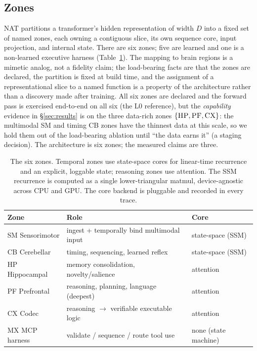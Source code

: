\documentclass[11pt]{article}
\newcommand{\zone}[1]{\textsc{#1}}
\begin{document}
\subsection{Zones}
NAT partitions a transformer's hidden representation of width $D$ into a fixed set of named zones,
each owning a contiguous slice, its own sequence core, input projection, and internal state. There
are six zones; five are learned and one is a non-learned executive harness (Table~\ref{tab:zones}).
The mapping to brain regions is a mimetic analog, not a fidelity claim; the load-bearing facts are
that the zones are declared, the partition is fixed at build time, and the assignment of a
representational slice to a named function is a property of the architecture rather than a discovery
made after training. All six zones are declared and the forward pass is exercised end-to-end on all
six (the L0 reference), but the \emph{capability} evidence in \S\ref{sec:results} is on the three
data-rich zones $\{\zone{HP},\zone{PF},\zone{CX}\}$: the multimodal \zone{SM} and timing \zone{CB} zones
have the thinnest data at this scale, so we hold them out of the load-bearing ablation until ``the
data earns it'' (a staging decision). The architecture is six zones; the measured claims are three.

\begin{table}[t]\centering\small
\begin{tabular}{@{}lll@{}}
\toprule
Zone & Role & Core \\
\midrule
\zone{SM} Sensorimotor & ingest + temporally bind multimodal input & state-space (SSM) \\
\zone{CB} Cerebellar & timing, sequencing, learned reflex & state-space (SSM) \\
\zone{HP} Hippocampal & memory consolidation, novelty/salience & attention \\
\zone{PF} Prefrontal & reasoning, planning, language (deepest) & attention \\
\zone{CX} Codec & reasoning $\rightarrow$ verifiable executable logic & attention \\
\zone{MX} MCP harness & validate / sequence / route tool use & none (state machine) \\
\bottomrule
\end{tabular}
\caption{The six zones. Temporal zones use state-space cores for linear-time recurrence and an
explicit, loggable state; reasoning zones use attention. The SSM recurrence is computed as a single
lower-triangular matmul, device-agnostic across CPU and GPU. The core backend is pluggable and
recorded in every trace.}
\label{tab:zones}
\end{table}
\end{document}

